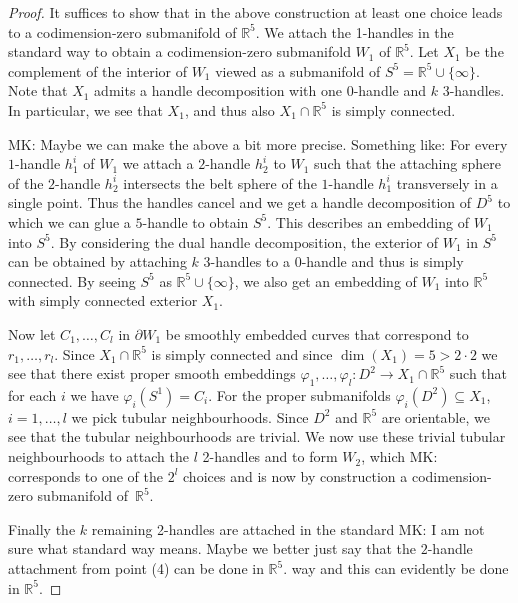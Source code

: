 \documentclass[10pt,a4paper]{amsart}
\newcommand{\R}{\mathbb{R}}
\newcommand{\comm}[2]{%
  {\color{red}#1: #2}}
\begin{document}
\begin{proof}
It suffices to show that in the above construction at least one choice leads to a codimension-zero submanifold of  $\R^5$.
We attach the 1-handles in the standard way to obtain a codimension-zero submanifold $W_1$ of $\R^5$. Let $X_1$ be  the complement of the interior of $W_1$ viewed as a submanifold of $S^5=\R^5\cup \{\infty\}$. Note that $X_1$ admits a handle decomposition with one 0-handle and $k$ 3-handles. In particular, we see that $X_1$, and thus also $X_1\cap \R^5$ is simply connected.

\comm{MK}{Maybe we can make the above a bit more precise. Something like: For every $1$-handle $h^i_1$ of $W_1$ we attach a $2$-handle $h_2^i$ to $W_1$ such that the attaching sphere of the $2$-handle $h_2^i$ intersects the belt sphere of the $1$-handle $h_1^i$ transversely in a single point. Thus the handles cancel and we get a handle decomposition of $D^5$ to which we can glue a $5$-handle to obtain $S^5$. This describes an embedding of $W_1$ into $S^5$. By considering the dual handle decomposition, the exterior of $W_1$ in $S^5$ can be obtained by attaching $k$ $3$-handles to a $0$-handle and thus is simply connected. By seeing $S^5$ as $\R^5\cup \{\infty\}$, we also get an embedding of $W_1$ into $\R^5$ with simply connected exterior $X_1$.}

Now let $C_1,\dots,C_l$ in $\partial W_1$ be smoothly embedded curves that correspond to $r_1,\dots,r_l$. Since 
$X_1\cap \R^5$ is simply connected and since $\dim(X_1)=5>2\cdot 2$
we see that there exist proper smooth embeddings $\varphi_1,\dots,\varphi_l\colon D^2 \to X_1\cap \R^5 $
such that for each $i$ we have $\varphi_i(S^1)=C_i$.
For the proper submanifolds $\varphi_i(D^2)\subseteq X_1$, $i=1,\dots,l$ we pick tubular neighbourhoods. Since $D^2$ and $\R^5$ are orientable, we see that the tubular neighbourhoods are trivial. We now use these trivial tubular neighbourhoods to attach the $l$ 2-handles
and to form $W_2$, which \comm{MK}{corresponds to one of the $2^l$ choices and} is now by construction a codimension-zero submanifold of~$\R^5$.

Finally the $k$ remaining 2-handles are attached in the standard \comm{MK}{I am not sure what standard way means. Maybe we better just say that the $2$-handle attachment from point (4) can be done in $\R^5$.} way and this can evidently be done in $\R^5$.
\end{proof}
\end{document}

